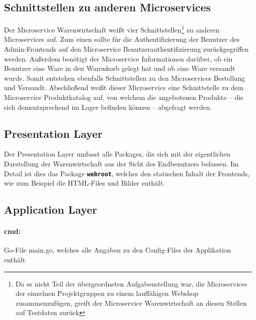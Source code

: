 \subsection{Schnittstellen zu anderen Microservices}
\label{subsec: Schnittstellen zu anderen Microservices}
Der Microservice Warenwirtschaft weißt vier Schnittstellen\footnote{Da es nicht Teil der übergeordneten Aufgabenstellung war, die Microservices der einzelnen Projektgruppen zu einem lauffähigen Webshop zusammenzufügen, greift der Microservice Warenwirtschaft an diesen Stellen auf Testdaten zurück} zu anderen Microservices auf. Zum einen sollte für die Authentifizierung der Benutzer des Admin-Frontends auf den Microservice Benutzerauthentifizierung zurückgegriffen werden. Außerdem benötigt der Microservice Informationen darüber, ob ein Benutzer eine Ware in den Warenkorb gelegt hat und ob eine Ware versandt wurde. Somit entstehen ebenfalls Schnittstellen zu den Microservices Bestellung und Versandt. Abschließend weißt dieser Microservice eine Schnittstelle zu dem Microservice Produktkatalog auf, von welchem die angebotenen Produkte -- die sich dementsprechend im Lager befinden können -- abgefragt werden.

\newpage
\subsection{Presentation Layer}
\label{subsec: Presentation Layer}
Der Presentation Layer umfasst alle  Packages, die sich mit der eigentlichen Darstellung der Warenwirtschaft aus der Sicht des Endbenutzers befassen. Im Detail ist dies das Package \textbf{\texttt{webroot}}, welches den statischen Inhalt der Frontends, wie zum Beispiel die HTML-Files und Bilder enthält.


\subsection{Application Layer}
\label{subsec: Application Layer}

\paragraph{cmd:} Go-File main.go, welches alle Angaben zu den Config-Files der Applikation enthält

